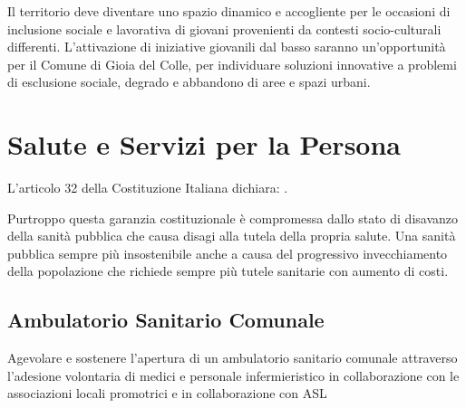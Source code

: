 \documentclass[a4paper,14pt,italian]{sphinxmanual}
\begin{document}

Il territorio deve diventare uno spazio dinamico e accogliente per le occasioni di inclusione sociale e lavorativa di giovani provenienti da contesti socio-culturali differenti.
L’attivazione di iniziative giovanili dal basso saranno un’opportunità per il Comune di Gioia del Colle, per individuare soluzioni innovative a problemi di esclusione sociale, degrado e abbandono di aree e spazi urbani.


\chapter{Salute e Servizi per la Persona}
\label{\detokenize{salute:salute-e-servizi-per-la-persona}}\label{\detokenize{salute::doc}}


L’articolo 32 della Costituzione Italiana dichiara: .

Purtroppo questa garanzia costituzionale è compromessa dallo stato di disavanzo della sanità pubblica che causa disagi alla tutela della propria salute.
Una sanità pubblica sempre più insostenibile anche a causa del progressivo invecchiamento della popolazione che richiede sempre più tutele sanitarie con aumento di costi.


\section{Ambulatorio Sanitario Comunale}
\label{\detokenize{salute:ambulatorio-sanitario-comunale}}
Agevolare e sostenere l’apertura di un ambulatorio sanitario comunale attraverso l’adesione volontaria di medici e personale infermieristico in collaborazione con le associazioni locali promotrici e in collaborazione con ASL
\end{document}
